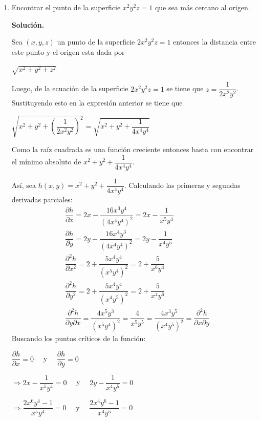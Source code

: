 \documentclass[fleqn, 12pt]{article}
\newcommand{\derivadaparcial}[2]{\dfrac{\partial {#1}}{\partial {#2}}}
\newcommand{\derivadaparcialn}[3]{\dfrac{\partial^{#3} {#1}}{\partial {#2}^{#3}}}
\newcommand{\derivadaparcialnd}[3]{\dfrac{\partial^{2} {#1}}{\partial {#3} \partial {#2}}}
\begin{document}
\begin{enumerate}
        \item Encontrar el punto de la superficie $ x^2 y^2 z = 1 $ que sea más cercano al origen.
        
        \textbf{Solución.}

        Sea $ (x,y,z) $ un punto de la superficie $ 2x^2 y^2 z = 1 $ entonces la distancia entre este punto y el origen esta dada por 

        $ \sqrt{x^2 + y^2 + z^2} $

        Luego, de la ecuación de la superficie $ 2x^2 y^2 z = 1 $ se tiene que $ z = \dfrac{1}{2x^2 y^2} $. Sustituyendo esto en la expresión anterior se tiene que

        $ \sqrt{x^2 + y^2 + \left( \dfrac{1}{2x^2 y^2} \right)^2} = \sqrt{x^2 + y^2 + \dfrac{1}{4x^4 y^4}} $

        Como la raíz cuadrada es una función creciente entonces basta con encontrar el mínimo absoluto de $ x^2 + y^2 + \dfrac{1}{4x^4 y^4} $.

        Así, sea $ h(x,y) = x^2 + y^2 + \dfrac{1}{4x^4 y^4} $. Calculando las primeras y segundas derivadas parciales:
        \begin{align*}
            & \derivadaparcial{h}{x} = 2x - \dfrac{16x^3 y^4}{(4x^4 y^4)^2} = 2x - \dfrac{1}{x^5 y^4} \\
            & \derivadaparcial{h}{y} = 2y - \dfrac{16x^4 y^3}{(4x^4 y^4)^2} = 2y - \dfrac{1}{x^4 y^5} \\
            & \derivadaparcialn{h}{x}{2} = 2 + \dfrac{5x^4 y^4}{(x^5 y^4)^2} = 2 + \dfrac{5}{x^6 y^4} \\
            & \derivadaparcialn{h}{y}{2} = 2 + \dfrac{5x^4 y^4}{(x^4 y^5)^2} = 2 + \dfrac{5}{x^4 y^6} \\
            & \derivadaparcialnd{h}{x}{y} = \dfrac{4x^5 y^3}{(x^5 y^4)^2} = \dfrac{4}{x^5 y^5} = \dfrac{4x^3 y^5}{(x^4 y^5)^2} = \derivadaparcialnd{h}{y}{x}
        \end{align*}
        Buscando los puntos críticos de la función:

        $ \derivadaparcial{h}{x} = 0 \quad $ y $ \quad \derivadaparcial{h}{y} = 0 $

        $ \Longrightarrow 2x - \dfrac{1}{x^5 y^4} = 0 \quad $ y $ \quad 2y - \dfrac{1}{x^4 y^5} = 0 $

        $ \Longrightarrow \dfrac{2x^6 y^4 - 1}{x^5 y^4} = 0 \quad $ y $ \quad \dfrac{2x^4 y^6 - 1}{x^4 y^5} = 0 $


\end{enumerate}
\end{document}
